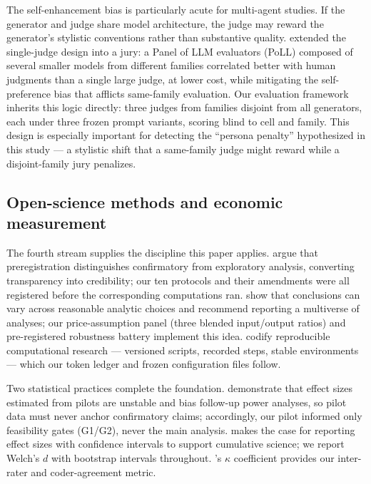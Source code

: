 \documentclass[12pt,a4paper]{article}
\begin{document}
The self-enhancement bias is particularly acute for multi-agent studies. If the
generator and judge share model architecture, the judge may reward the
generator's stylistic conventions rather than substantive quality.
\citet{VergaEtAl2024} extended the single-judge design into a jury: a Panel of
LLM evaluators (PoLL) composed of several smaller models from different
families correlated better with human judgments than a single large judge, at
lower cost, while mitigating the self-preference bias that afflicts same-family
evaluation. Our evaluation framework inherits this logic directly: three judges
from families disjoint from all generators, each under three frozen prompt
variants, scoring blind to cell and family. This design is especially important
for detecting the ``persona penalty'' hypothesized in this study --- a stylistic
shift that a same-family judge might reward while a disjoint-family jury
penalizes.

\subsection{Open-science methods and economic measurement}

The fourth stream supplies the discipline this paper applies. \citet{NosekEtAl2018}
argue that preregistration distinguishes confirmatory from exploratory
analysis, converting transparency into credibility; our ten protocols and their
amendments were all registered before the corresponding computations ran.
\citet{SteegenEtAl2016} show that conclusions can vary across reasonable
analytic choices and recommend reporting a multiverse of analyses; our
price-assumption panel (three blended input/output ratios) and pre-registered
robustness battery implement this idea. \citet{SandveEtAl2013} codify
reproducible computational research --- versioned scripts, recorded steps,
stable environments --- which our token ledger and frozen configuration files
follow.

Two statistical practices complete the foundation. \citet{AlbersLakens2018}
demonstrate that effect sizes estimated from pilots are unstable and bias
follow-up power analyses, so pilot data must never anchor confirmatory claims;
accordingly, our pilot informed only feasibility gates (G1/G2), never the main
analysis. \citet{Lakens2013} makes the case for reporting effect sizes with
confidence intervals to support cumulative science; we report Welch's $d$ with
bootstrap intervals throughout. \citet{Cohen1960}'s $\kappa$ coefficient
provides our inter-rater and coder-agreement metric.
\end{document}
